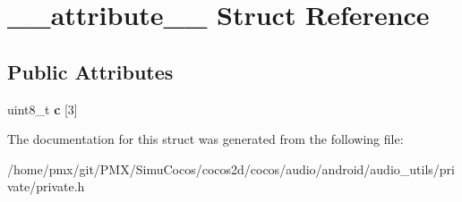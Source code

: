 \hypertarget{struct____attribute____}{}\section{\+\_\+\+\_\+attribute\+\_\+\+\_\+ Struct Reference}
\label{struct____attribute____}
\subsection*{Public Attributes}
\begin{DoxyCompactItemize}
\item 
\mbox{\label{struct____attribute_____abeaf655f6b7eea5f3eeb3085803e5d2a}} 
uint8\+\_\+t {\bfseries c} \mbox{[}3\mbox{]}
\end{DoxyCompactItemize}


The documentation for this struct was generated from the following file\+:\begin{DoxyCompactItemize}
\item 
/home/pmx/git/\+P\+M\+X/\+Simu\+Cocos/cocos2d/cocos/audio/android/audio\+\_\+utils/private/private.\+h\end{DoxyCompactItemize}
